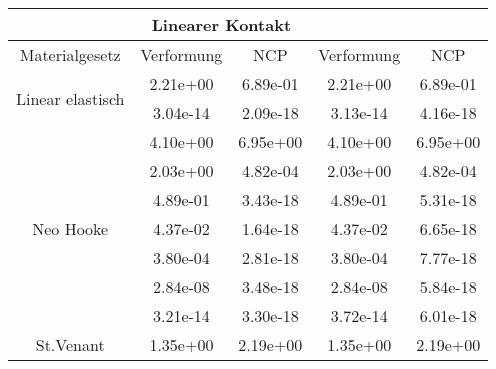 \begin{table} 
\centering 
\begin{tabular}{c|cc|cc|} 
\cline{2-5} 
 & \multicolumn{2}{|c|}{Linearer Kontakt} &  \\ 
\hline 
\multicolumn{1}{|c|}{Materialgesetz} & \multicolumn{1}{c|}{Verformung} & \multicolumn{1}{c|}{NCP} & \multicolumn{1}{c|}{Verformung} & \multicolumn{1}{c|}{NCP} \\ 
\hline 
\multicolumn{1}{|c|}{\multirow{2}{*}{Linear elastisch}} &\multicolumn{1}{|c|}{  2.21e+00} & \multicolumn{1}{|c|}{  6.89e-01} & \multicolumn{1}{|c|}{  2.21e+00} & \multicolumn{1}{|c|}{  6.89e-01} \\ 
\multicolumn{1}{|c|}{} & \multicolumn{1}{|c|}{  3.04e-14} & \multicolumn{1}{|c|}{  2.09e-18} & \multicolumn{1}{|c|}{  3.13e-14} & \multicolumn{1}{|c|}{  4.16e-18} \\ 
\hline 
\multicolumn{1}{|c|}{\multirow{7}{*}{Neo Hooke}} &\multicolumn{1}{|c|}{  4.10e+00} & \multicolumn{1}{|c|}{  6.95e+00} & \multicolumn{1}{|c|}{  4.10e+00} & \multicolumn{1}{|c|}{  6.95e+00} \\ 
\multicolumn{1}{|c|}{} & \multicolumn{1}{|c|}{  2.03e+00} & \multicolumn{1}{|c|}{  4.82e-04} & \multicolumn{1}{|c|}{  2.03e+00} & \multicolumn{1}{|c|}{  4.82e-04} \\ 
\multicolumn{1}{|c|}{} & \multicolumn{1}{|c|}{  4.89e-01} & \multicolumn{1}{|c|}{  3.43e-18} & \multicolumn{1}{|c|}{  4.89e-01} & \multicolumn{1}{|c|}{  5.31e-18} \\ 
\multicolumn{1}{|c|}{} & \multicolumn{1}{|c|}{  4.37e-02} & \multicolumn{1}{|c|}{  1.64e-18} & \multicolumn{1}{|c|}{  4.37e-02} & \multicolumn{1}{|c|}{  6.65e-18} \\ 
\multicolumn{1}{|c|}{} & \multicolumn{1}{|c|}{  3.80e-04} & \multicolumn{1}{|c|}{  2.81e-18} & \multicolumn{1}{|c|}{  3.80e-04} & \multicolumn{1}{|c|}{  7.77e-18} \\ 
\multicolumn{1}{|c|}{} & \multicolumn{1}{|c|}{  2.84e-08} & \multicolumn{1}{|c|}{  3.48e-18} & \multicolumn{1}{|c|}{  2.84e-08} & \multicolumn{1}{|c|}{  5.84e-18} \\ 
\multicolumn{1}{|c|}{} & \multicolumn{1}{|c|}{  3.21e-14} & \multicolumn{1}{|c|}{  3.30e-18} & \multicolumn{1}{|c|}{  3.72e-14} & \multicolumn{1}{|c|}{  6.01e-18} \\ 
\hline 
\multicolumn{1}{|c|}{\multirow{15}{*}{St.Venant}} &\multicolumn{1}{|c|}{  1.35e+00} & \multicolumn{1}{|c|}{  2.19e+00} & \multicolumn{1}{|c|}{  1.35e+00} & \multicolumn{1}{|c|}{  2.19e+00} \\ 

\end{tabular}
\end{table}
